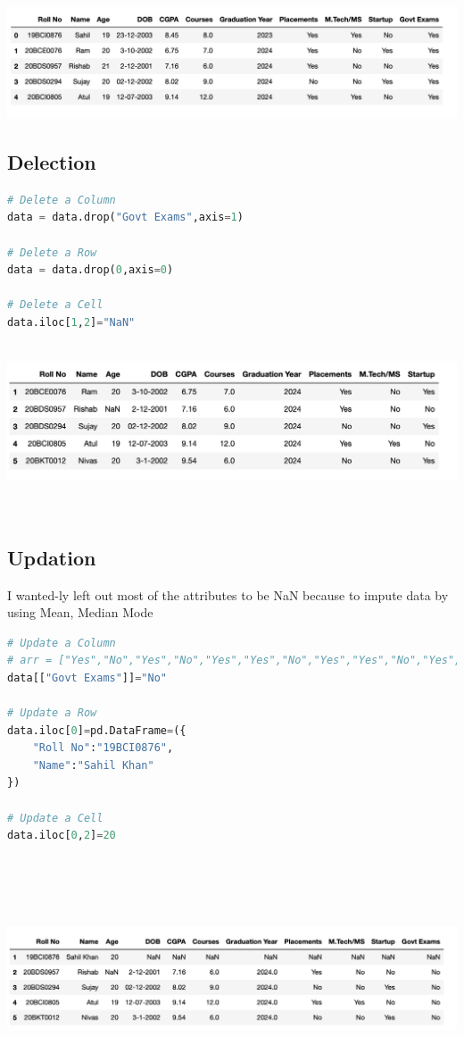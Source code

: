 \documentclass{article}
\begin{document}
\includegraphics[scale=0.65]{images/two.png}
\subsection{Delection}
\begin{lstlisting}[language=Python]
# Delete a Column
data = data.drop("Govt Exams",axis=1)

# Delete a Row
data = data.drop(0,axis=0)

# Delete a Cell
data.iloc[1,2]="NaN"
    
\end{lstlisting}
\includegraphics[scale=0.65]{images/three.png}\\\\\
\subsection{Updation}
I wanted-ly left out most of the attributes to be NaN because to impute data by using Mean, Median Mode
\begin{lstlisting}[language=Python]
# Update a Column
# arr = ["Yes","No","Yes","No","Yes","Yes","No","Yes","Yes","No","Yes","Yes","No","Yes","Yes","No","Yes","Yes","No","Yes","Yes","No","Yes","Yes"]
data[["Govt Exams"]]="No"

# Update a Row
data.iloc[0]=pd.DataFrame=({
    "Roll No":"19BCI0876",
    "Name":"Sahil Khan"
})

# Update a Cell
data.iloc[0,2]=20
    
\end{lstlisting}\\\\\\
\includegraphics[scale=0.65]{images/four.png}
\end{document}
